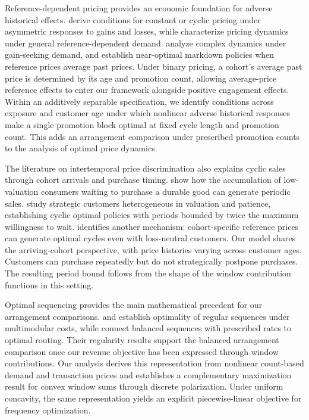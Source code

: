 Reference-dependent pricing provides an economic foundation for adverse historical effects. \citet{kopalle1996reference} derive conditions for constant or cyclic pricing under asymmetric responses to gains and losses, while \citet{popescu2007} characterize pricing dynamics under general reference-dependent demand. \citet{hu2016gainseeking} analyze complex dynamics under gain-seeking demand, and \citet{agrawal2024reference} establish near-optimal markdown policies when reference prices average past prices. Under binary pricing, a cohort's average past price is determined by its age and promotion count, allowing average-price reference effects to enter our framework alongside positive engagement effects. Within an additively separable specification, we identify conditions across exposure and customer age under which nonlinear adverse historical responses make a single promotion block optimal at fixed cycle length and promotion count. This adds an arrangement comparison under prescribed promotion counts to the analysis of optimal price dynamics.

The literature on intertemporal price discrimination also explains cyclic sales through cohort arrivals and purchase timing. \citet{conlisk1984cyclic} show how the accumulation of low-valuation consumers waiting to purchase a durable good can generate periodic sales. \citet{besbeslobel2015} study strategic customers heterogeneous in valuation and patience, establishing cyclic optimal policies with periods bounded by twice the maximum willingness to wait. \citet{wang2016reference} identifies another mechanism: cohort-specific reference prices can generate optimal cycles even with loss-neutral customers. Our model shares the arriving-cohort perspective, with price histories varying across customer ages. Customers can purchase repeatedly but do not strategically postpone purchases. The resulting period bound follows from the shape of the window contribution functions in this setting.

Optimal sequencing provides the main mathematical precedent for our arrangement comparisons. \citet{hajek1985extremal} and \citet{altman2000multimodularity} establish optimality of regular sequences under multimodular costs, while \citet{altman2000balanced} connect balanced sequences with prescribed rates to optimal routing. Their regularity results support the balanced arrangement comparison once our revenue objective has been expressed through window contributions. Our analysis derives this representation from nonlinear count-based demand and transaction prices and establishes a complementary maximization result for convex window sums through discrete polarization. Under uniform concavity, the same representation yields an explicit piecewise-linear objective for frequency optimization.

